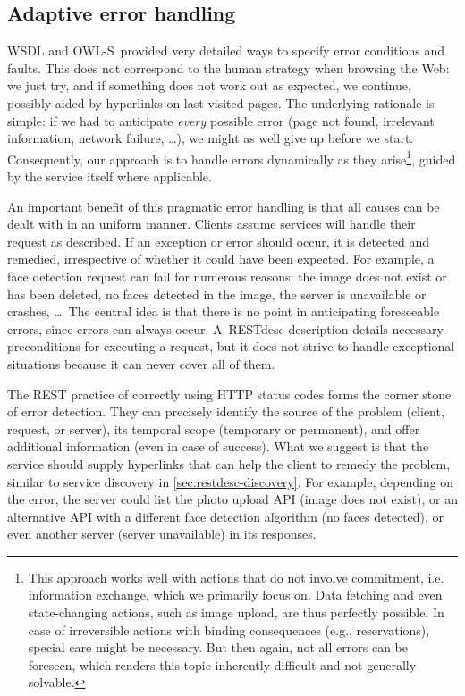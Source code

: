 \documentclass[runningheads,a4paper, twocolumn]{llncs}
\newcommand{\owls}{\mbox{OWL-S}}
\begin{document}
\subsection{Adaptive error handling}
WSDL and \owls\ provided very detailed ways to specify error conditions and faults. This does not correspond to the human strategy when browsing the Web: we just try, and if something does not work out as expected, we continue, possibly aided by hyperlinks on last visited pages. The underlying rationale is simple: if we had to anticipate \emph{every} possible error (page not found, irrelevant information, network failure, \ldots), we might as well give up before we start. Consequently, our approach is to handle errors dynamically as they arise\footnote{This approach works well with actions that do not involve commitment, i.e. information exchange, which we primarily focus on. Data fetching and even state-changing actions, such as image upload, are thus perfectly possible. In case of irreversible actions with binding consequences (e.g., reservations), special care might be necessary. But then again, not all errors can be foreseen, which renders this topic inherently difficult and not generally solvable.}, guided by the service itself where applicable.

An important benefit of this pragmatic error handling is that all causes can be dealt with in an uniform manner. Clients assume services will handle their request as described. If an exception or error should occur, it is detected and remedied, irrespective of whether it could have been expected. For example, a face detection request can fail for numerous reasons: the image does not exist or has been deleted, no faces detected in the image, the server is unavailable or crashes, \ldots\ The central idea is that there is no point in anticipating foreseeable errors, since errors can always occur. A~RESTdesc description details necessary preconditions for executing a request, but it does not strive to handle exceptional situations because it can never cover all of them.

The REST practice of correctly using HTTP status codes forms the corner stone of error detection. They can precisely identify the source of the problem (client, request, or server), its temporal scope (temporary or permanent), and offer additional information (even in case of success). What we suggest is that the service should supply hyperlinks that can help the client to remedy the problem, similar to service discovery in \autoref{sec:restdesc-discovery}. For example, depending on the error, the server could list the photo upload API (image does not exist), or an alternative API with a different face detection algorithm (no faces detected), or even another server (server unavailable) in its responses.
\end{document}
